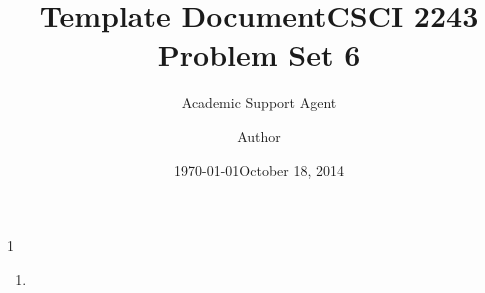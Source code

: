 \documentclass{article}
\title{Template Document}
\author{Academic Support Agent}
\date{\today}
\begin{document}
\maketitle

\title{CSCI 2243 Problem Set 6}
\author{Author}
\date{October 18, 2014}
\maketitle
\begin{problem}{1}
\renewcommand{\labelenumi}{(\alph{enumi})}
\begin{enumerate}
\item
\end{enumerate}
\end{problem}
\end{document}
